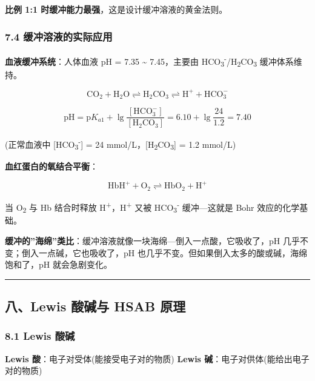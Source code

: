 \textbf{比例 1:1 时缓冲能力最强}，这是设计缓冲溶液的黄金法则。

\subsubsection{7.4 缓冲溶液的实际应用}\label{ux7f13ux51b2ux6eb6ux6db2ux7684ux5b9eux9645ux5e94ux7528}

\textbf{血液缓冲系统}：人体血液 pH = 7.35 \textasciitilde{} 7.45，主要由 HCO\textsubscript{3}\textsuperscript{-}/H\textsubscript{2}CO\textsubscript{3} 缓冲体系维持。

\[
\mathrm{CO_2 + H_2O \rightleftharpoons H_2CO_3 \rightleftharpoons H^+ + HCO_3^-}
\]

\[
\mathrm{pH} = \mathrm{p}K_{a1} + \lg\frac{[\mathrm{HCO_3^-}]}{[\mathrm{H_2CO_3}]} = 6.10 + \lg\frac{24}{1.2} = 7.40
\]

(正常血液中 {[}HCO\textsubscript{3}\textsuperscript{-}{]} = 24 mmol/L，{[}H\textsubscript{2}CO\textsubscript{3}{]} = 1.2 mmol/L)

\textbf{血红蛋白的氧结合平衡}：

\[
\mathrm{HbH^+ + O_2 \rightleftharpoons HbO_2 + H^+}
\]

当 O\textsubscript{2} 与 Hb 结合时释放 H\textsuperscript{+}，H\textsuperscript{+} 又被 HCO\textsubscript{3}\textsuperscript{-} 缓冲---这就是 Bohr 效应的化学基础。

\textbf{缓冲的''海绵''类比}：缓冲溶液就像一块海绵---倒入一点酸，它吸收了，pH 几乎不变；倒入一点碱，它也吸收了，pH 也几乎不变。但如果倒入太多的酸或碱，海绵饱和了，pH 就会急剧变化。

\begin{center}\rule{0.5\linewidth}{0.5pt}\end{center}

\subsection{八、Lewis 酸碱与 HSAB 原理}\label{ux516blewis-ux9178ux78b1ux4e0e-hsab-ux539fux7406}

\subsubsection{8.1 Lewis 酸碱}\label{lewis-ux9178ux78b1}

\textbf{Lewis 酸}：电子对受体(能接受电子对的物质)
\textbf{Lewis 碱}：电子对供体(能给出电子对的物质)


